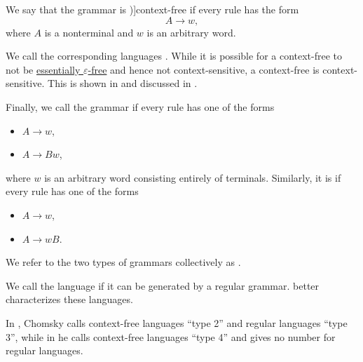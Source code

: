 \begin{definition}
\begin{thmenum}
     We say that the grammar is \term[ru=безконтекстная / контекстно-свободная (грамматика) (\cite[29]{Гладкий1973})]{context-free} if every rule has the form
    \begin{equation*}
      A \to w,
    \end{equation*}
    where \( A \) is a nonterminal and \( w \) is an arbitrary word.

    We call the corresponding languages . While it is possible for a context-free  to not be \hyperref[def:epsilon_free_grammar]{essentially \( \varepsilon \)-free} and hence not context-sensitive, a context-free  is context-sensitive. This is shown in  and discussed in .

     Finally, we call the grammar  if every rule has one of the forms
    \begin{itemize}
      \item \( A \to w \),
      \item \( A \to B w \),
    \end{itemize}
    where \( w \) is an arbitrary word consisting entirely of terminals. Similarly, it is  if every rule has one of the forms
    \begin{itemize}
      \item \( A \to w \),
      \item \( A \to w B \).
    \end{itemize}

    We refer to the two types of grammars collectively as .

    We call the language  if it can be generated by a regular grammar.  better characterizes these languages.
  \end{thmenum}
\end{definition}
\begin{comments}
  \item In \cite[142]{Chomsky1959}, Chomsky calls context-free languages \enquote{type 2} and regular languages \enquote{type 3}, while in \cite[366]{MathPsychology1963Vol2} he calls context-free languages \enquote{type 4} and gives no number for regular languages.
\end{comments}

